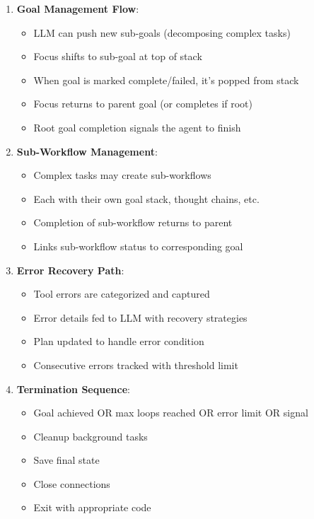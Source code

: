 \documentclass[12pt,a4paper]{article}
\begin{document}
\begin{enumerate}[label=\arabic*.]
\begin{itemize}
    \end{itemize}
    \item \textbf{Goal Management Flow}:
    \begin{itemize}
        \item LLM can push new sub-goals (decomposing complex tasks)
        \item Focus shifts to sub-goal at top of stack
        \item When goal is marked complete/failed, it's popped from stack
        \item Focus returns to parent goal (or completes if root)
        \item Root goal completion signals the agent to finish
    \end{itemize}
    \item \textbf{Sub-Workflow Management}:
    \begin{itemize}
        \item Complex tasks may create sub-workflows
        \item Each with their own goal stack, thought chains, etc.
        \item Completion of sub-workflow returns to parent
        \item Links sub-workflow status to corresponding goal
    \end{itemize}
    \item \textbf{Error Recovery Path}:
    \begin{itemize}
        \item Tool errors are categorized and captured
        \item Error details fed to LLM with recovery strategies
        \item Plan updated to handle error condition
        \item Consecutive errors tracked with threshold limit
    \end{itemize}
    \item \textbf{Termination Sequence}:
    \begin{itemize}
        \item Goal achieved OR max loops reached OR error limit OR signal
        \item Cleanup background tasks
        \item Save final state
        \item Close connections
        \item Exit with appropriate code
    \end{itemize}
\end{enumerate}
\end{document}
